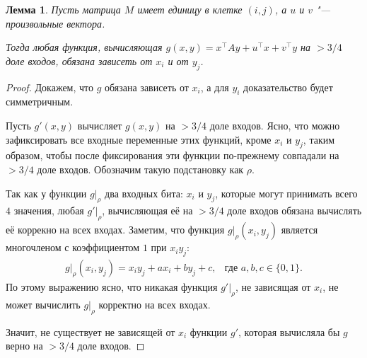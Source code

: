 \documentclass[oneside, a4paper]{article}
\newtheorem{lemma}{Лемма}
\theoremstyle{plain}
\theoremstyle{remark}
\begin{document}
\begin{lemma} \label{single_one}
Пусть матрица $M$ имеет единицу в клетке $(i, j)$, а $u$ и $v$ "--- произвольные
вектора.

Тогда любая функция, вычисляющая $g(x, y) = x^\top A y + u^\top x + v^\top y$ на
$> 3/4$ доле входов, обязана зависеть от $x_i$ и от $y_j$.
\end{lemma}
\begin{proof}
Докажем, что $g$ обязана зависеть от $x_i$, а для $y_i$ доказательство будет
симметричным.

Пусть $g'(x, y)$ вычисляет $g(x, y)$ на $> 3/4$ доле входов. Ясно, что можно
зафиксировать все входные переменные этих функций, кроме $x_i$ и $y_j$, таким
образом, чтобы после фиксирования эти функции по-прежнему совпадали на $> 3/4$
доле входов. Обозначим такую подстановку как $\rho$.

Так как у функции $g \rvert _ \rho$ два входных бита: $x_i$ и $y_j$, которые
могут принимать всего $4$ значения, любая $g' \rvert _ \rho$, вычисляющая
её на $> 3/4$ доле входов обязана вычислять её коррекно на всех входах. Заметим,
что функция $g \rvert _ \rho(x_i, y_j)$ является многочленом с коэффициентом $1$
при $x_i y_j$:
\[
\begin{aligned}
&g \rvert _ \rho (x_i, y_j) = x_i y_j + a x_i + b y_j + c,
&
\text{где $a, b, c \in \{0, 1\}$.}&
\end{aligned}
\]
По этому выражению ясно, что никакая функция $g' \rvert _ \rho$, не зависящая от
$x_i$, не может вычислить $g \rvert _ \rho$ корректно на всех входах.

Значит, не существует не зависящей от $x_i$ функции $g'$, которая вычисляла бы
$g$ верно на $> 3/4$ доле входов.
\end{proof}
\end{document}
